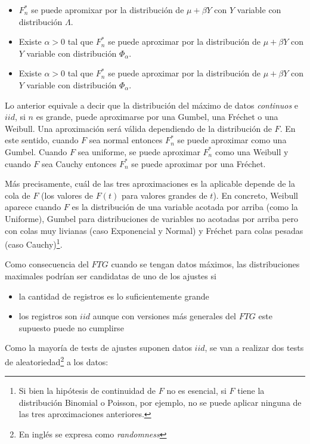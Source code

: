 \documentclass[
  12pt]{article}
\begin{document}
\begin{itemize}
  \item[1)] $F_n^*$ se puede apromixar por la distribución de $\mu+\beta Y$ con $Y$ variable con distribución $\Lambda$.
  \item[2)] Existe $\alpha>0$ tal que $F_n^*$ se puede aproximar por la distribución de $\mu+\beta Y$ con $Y$ variable con distribución $\Phi_{\alpha}$. 
  \item[3)] Existe $\alpha>0$ tal que $F_n^*$ se puede aproximar por la distribución de $\mu+\beta Y$ con $Y$ variable con distribución $\Phi_{\alpha}$.
\end{itemize}

Lo anterior equivale a decir que la distribución del máximo de datos
\textit{continuos} e \(iid\), si \(n\) es grande, puede aproximarse por
una Gumbel, una Fréchet o una Weibull. Una aproximación será válida
dependiendo de la distribución de \(F\). En este sentido, cuando \(F\)
sea normal entonces \(F_n^*\) se puede aproximar como una Gumbel. Cuando
\(F\) sea uniforme, se puede aproximar \(F_n^*\) como una Weibull y
cuando \(F\) sea Cauchy entonces \(F_n^*\) se puede aproximar por una
Fréchet.

Más precisamente, cuál de las tres aproximaciones es la aplicable
depende de la cola de \(F\) (los valores de \(F(t)\) para valores
grandes de \(t\)). En concreto, Weibull aparece cuando \(F\) es la
distribución de una variable acotada por arriba (como la Uniforme),
Gumbel para distribuciones de variables no acotadas por arriba pero con
colas muy livianas (caso Exponencial y Normal) y Fréchet para colas
pesadas (caso
Cauchy)\footnote{Si bien  la hipótesis de continuidad de $F$ no es esencial, si $F$ tiene
la distribución Binomial o Poisson, por ejemplo, no se puede aplicar ninguna de las tres aproximaciones anteriores.}.

Como consecuencia del \(FTG\) cuando se tengan datos máximos, las
distribuciones maximales podrían ser candidatas de uno de los ajustes si

\begin{itemize}
\item la cantidad de registros es lo suficientemente grande
\item los registros son $iid$ aunque con versiones más generales del $FTG$ este supuesto puede no cumplirse
\end{itemize}

Como la mayoría de tests de ajustes suponen datos \(iid\), se van a
realizar dos tests de
aleatoriedad\footnote{En inglés se expresa como \textit{randomness}} a
los datos:
\end{document}
